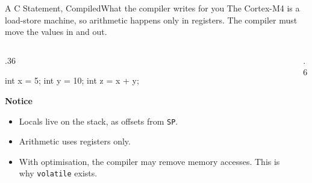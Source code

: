 \documentclass[9pt,aspectratio=169,xcolor=table]{beamer}
\begin{document}
\begin{frame}[fragile]{A C Statement, Compiled}{What the compiler writes for you}
    \leavevmode
    The Cortex-M4 is a load-store machine, so arithmetic happens only in registers. The compiler must move the values in and out.

    \vspace{2mm}
    \begin{columns}[T]
    \begin{column}{.36\textwidth}
\begin{cc}[basicstyle=\ttfamily\footnotesize]
int x = 5;
int y = 10;
int z = x + y;
\end{cc}

        \vspace{2mm}
        {\small \textbf{Notice}
        \begin{itemize}\itemsep1pt
            \item Locals live on the \alert{stack}, as offsets from \texttt{SP}.
            \item Arithmetic uses \alert{registers only}.
            \item With optimisation, the compiler may remove memory accesses. This is why \texttt{volatile} exists.
        \end{itemize}}
    \end{column}
    \begin{column}{.6\textwidth}
    \end{column}
    \end{columns}
\end{frame}
\end{document}
